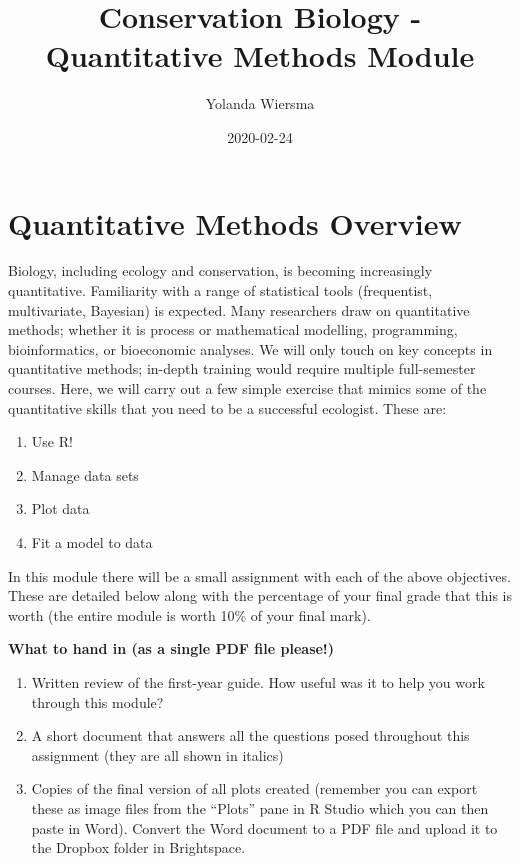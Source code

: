 \documentclass[]{book}
\title{Conservation Biology - Quantitative Methods Module}
\author{Yolanda Wiersma}
\date{2020-02-24}
\providecommand{\tightlist}{%
  \setlength{\itemsep}{0pt}\setlength{\parskip}{0pt}}
\begin{document}
\maketitle

{
\setcounter{tocdepth}{1}
\tableofcontents
}
\chapter{Quantitative Methods
Overview}\label{quantitative-methods-overview}

Biology, including ecology and conservation, is becoming increasingly
quantitative. Familiarity with a range of statistical tools
(frequentist, multivariate, Bayesian) is expected. Many researchers draw
on quantitative methods; whether it is process or mathematical
modelling, programming, bioinformatics, or bioeconomic analyses. We will
only touch on key concepts in quantitative methods; in-depth training
would require multiple full-semester courses. Here, we will carry out a
few simple exercise that mimics some of the quantitative skills that you
need to be a successful ecologist. These are:

\begin{enumerate}
\def\labelenumi{\arabic{enumi}.}
\tightlist
\item
  Use R!
\item
  Manage data sets
\item
  Plot data
\item
  Fit a model to data
\end{enumerate}

In this module there will be a small assignment with each of the above
objectives. These are detailed below along with the percentage of your
final grade that this is worth (the entire module is worth 10\% of your
final mark).

\textbf{What to hand in (as a single PDF file please!)}

\begin{enumerate}
\def\labelenumi{\arabic{enumi}.}
\item
  Written review of the first-year guide. How useful was it to help you
  work through this module?
\item
  A short document that answers all the questions posed throughout this
  assignment (they are all shown in italics)
\item
  Copies of the final version of all plots created (remember you can
  export these as image files from the ``Plots'' pane in R Studio which
  you can then paste in Word). Convert the Word document to a PDF file
  and upload it to the Dropbox folder in Brightspace.
\end{enumerate}
\end{document}
